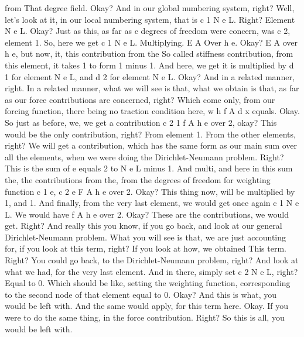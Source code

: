 \documentclass[10pt]{article}
\begin{document}
from That degree field. Okay? And in our global numbering system, right? Well, let's look at it, in our local numbering system, that is c 1 N e L. Right? Element N e L. Okay? Just as this, as far as c degrees of freedom were concern, was c 2, element 1. So, here we get c 1 N e L. Multiplying. E A Over h e. Okay? E A over h e, but now, it, this contribution from the So called stiffness contribution, from this element, it takes 1 to form 1 minus 1. And here, we get  it is multiplied by d 1 for element N e L, and d 2 for element N e L. Okay? And in a related manner, right. In a related manner, what we will see is that, what we obtain is that, as far as our force contributions are concerned, right? Which come only, from our forcing function, there being no traction condition here, w h f A d x equals. Okay. So just as before, we, we get a contribution c 2 1 f A h e over 2, okay? This would be the only contribution, right? From element 1. From the other elements, right? We will get a contribution, which has the same form as our main sum over all the elements, when we were doing the Dirichlet-Neumann problem. Right? This is the sum of e equals 2 to N e L minus 1. And multi, and here in this sum the, the contributions from the, from the degrees of freedom for weighting function c 1 e, c 2 e F A h e over 2. Okay? This thing now, will be multiplied by 1, and 1. And finally, from the very last element, we would get once again c 1 N e L. We would have f A h e over 2. Okay? These are the contributions, we would get. Right? And really this you know, if you go back, and look at our general Dirichlet-Neumann problem. What you will see is that, we are just accounting for, if you look at this term, right? If you look at how, we obtained This term. Right? You could go back, to the Dirichlet-Neumann problem, right? And look at what we had, for the very last element. And in there, simply set c 2 N e L, right? Equal to 0. Which should be like, setting the weighting function, corresponding to the second node of that element equal to 0. Okay? And this is what, you would be left with. And the same would apply, for this term here. Okay. If you were to do the same thing, in the force contribution. Right? So this is all, you would be left with.
\end{document}
